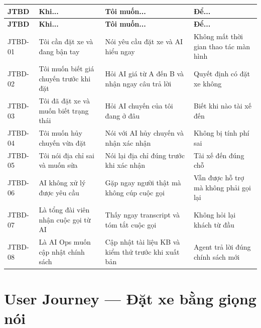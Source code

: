 \documentclass[12pt,a4paper]{article}
\begin{document}
\begin{longtable}{C{1.5cm} L{3.5cm} L{4cm} L{5cm}}
  \toprule{}\textbf{JTBD}&\textbf{Khi...}&\textbf{Tôi muốn...}&\textbf{Để...}\\
  \midrule\endfirsthead\toprule{}\textbf{JTBD}&\textbf{Khi...}&\textbf{Tôi muốn...}&\textbf{Để...}\\\midrule\endhead\bottomrule\endlastfoot
  JTBD-01 & Tôi cần đặt xe và đang bận tay & Nói yêu cầu đặt xe và AI hiểu ngay & Không mất thời gian thao tác màn hình \\
  JTBD-02 & Tôi muốn biết giá chuyến trước khi đặt & Hỏi AI giá từ A đến B và nhận ngay câu trả lời & Quyết định có đặt xe không \\
  JTBD-03 & Tôi đã đặt xe và muốn biết trạng thái & Hỏi AI chuyến của tôi đang ở đâu & Biết khi nào tài xế đến \\
  JTBD-04 & Tôi muốn hủy chuyến vừa đặt & Nói với AI hủy chuyến và nhận xác nhận & Không bị tính phí sai \\
  JTBD-05 & Tôi nói địa chỉ sai và muốn sửa & Nói lại địa chỉ đúng trước khi xác nhận & Tài xế đến đúng chỗ \\
  JTBD-06 & AI không xử lý được yêu cầu & Gặp ngay người thật mà không cúp cuộc gọi & Vẫn được hỗ trợ mà không phải gọi lại \\
  JTBD-07 & Là tổng đài viên nhận cuộc gọi từ AI & Thấy ngay transcript và tóm tắt cuộc gọi & Không hỏi lại khách từ đầu \\
  JTBD-08 & Là AI Ops muốn cập nhật chính sách & Cập nhật tài liệu KB và kiểm thử trước khi xuất bản & Agent trả lời đúng chính sách mới \\
\end{longtable}

\section{User Journey --- Đặt xe bằng giọng nói}
\end{document}
